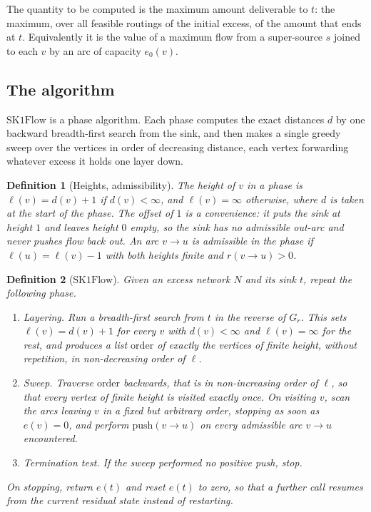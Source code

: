 \documentclass[10pt]{article}
\newtheorem{definition}{Definition}
\newcommand{\SKF}{\text{SK1Flow}}
\newcommand{\arc}[2]{#1\!\to\!#2}
\begin{document}
The quantity to be computed is the maximum amount deliverable to $t$: the
maximum, over all feasible routings of the initial excess, of the amount that
ends at $t$. Equivalently it is the value of a maximum flow from a super-source
$s$ joined to each $v$ by an arc of capacity $e_0(v)$.

\subsection{The algorithm}

$\SKF$ is a phase algorithm. Each phase computes the exact distances $d$ by one
backward breadth-first search from the sink, and then makes a single greedy
sweep over the vertices in order of decreasing distance, each vertex forwarding
whatever excess it holds one layer down.

\begin{definition}[Heights, admissibility]\label{def:height}
The \emph{height} of $v$ in a phase is $\ell(v)=d(v)+1$ if $d(v)<\infty$, and
$\ell(v)=\infty$ otherwise, where $d$ is taken at the start of the phase. The
offset of $1$ is a convenience: it puts the sink at height $1$ and leaves
height $0$ empty, so the sink has no admissible out-arc and never pushes flow
back out. An arc $\arc{v}{u}$ is \emph{admissible in the phase} if
$\ell(u)=\ell(v)-1$ with both heights finite and $r(\arc{v}{u})>0$.
\end{definition}

\begin{definition}[$\SKF$]\label{def:alg}
Given an excess network $N$ and its sink $t$, repeat the following
\emph{phase}.
\begin{enumerate}
  \item \emph{Layering.} Run a breadth-first search from $t$ in the reverse of
  $G_r$. This sets $\ell(v)=d(v)+1$ for every $v$ with $d(v)<\infty$ and
  $\ell(v)=\infty$ for the rest, and produces a list
  $\mathrm{order}$ of exactly the vertices of finite height, without
  repetition, in non-decreasing order of $\ell$.

  \item \emph{Sweep.} Traverse $\mathrm{order}$ backwards, that is in
  non-increasing order of $\ell$, so that every vertex of finite height is
  visited exactly once. On visiting $v$, scan the arcs leaving $v$ in a fixed
  but arbitrary order, stopping as soon as $e(v)=0$, and perform
  $\mathrm{push}(\arc{v}{u})$ on every admissible arc $\arc{v}{u}$
  encountered.

  \item \emph{Termination test.} If the sweep performed no positive push, stop.
\end{enumerate}
On stopping, return $e(t)$ and reset $e(t)$ to zero, so that a further call
resumes from the current residual state instead of restarting.
\end{definition}
\end{document}
